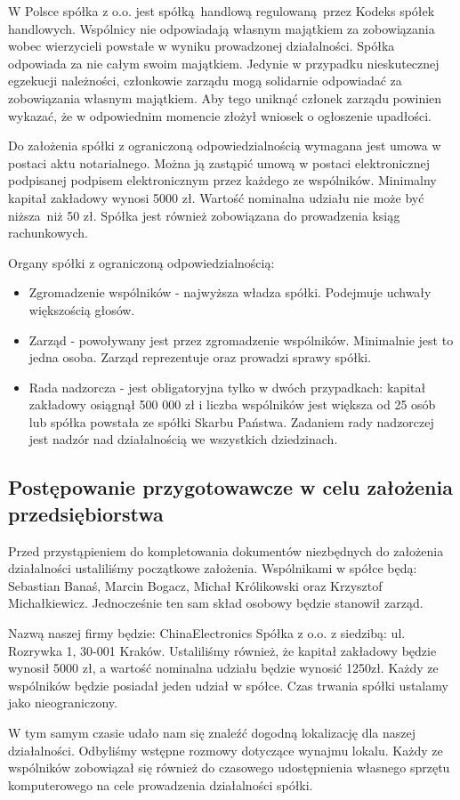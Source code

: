 W Polsce spółka z o.o. jest spółką handlową regulowaną przez Kodeks spółek handlowych. Wspólnicy nie odpowiadają własnym majątkiem za zobowiązania wobec wierzycieli powstałe w wyniku prowadzonej działalności. Spółka odpowiada za nie całym swoim majątkiem. Jedynie w przypadku nieskutecznej egzekucji należności, członkowie zarządu mogą solidarnie odpowiadać za zobowiązania własnym majątkiem. Aby tego uniknąć członek zarządu powinien wykazać, że w odpowiednim momencie złożył wniosek o ogłoszenie upadłości. 

Do założenia spółki z ograniczoną odpowiedzialnością wymagana jest umowa w postaci aktu notarialnego. Można ją zastąpić umową w postaci elektronicznej podpisanej podpisem elektronicznym przez każdego ze wspólników. Minimalny kapitał zakładowy wynosi 5000 zł. Wartość nominalna udziału nie może być niższa niż 50 zł. Spółka jest również zobowiązana do prowadzenia ksiąg rachunkowych.

Organy spółki z ograniczoną odpowiedzialnością:
\begin{itemize}
	\item Zgromadzenie wspólników - najwyższa władza spółki. Podejmuje uchwały większością głosów. 
	\item Zarząd - powoływany jest przez zgromadzenie wspólników. Minimalnie jest to jedna osoba. Zarząd reprezentuje oraz prowadzi sprawy spółki. 
	\item Rada nadzorcza - jest obligatoryjna tylko w dwóch przypadkach: kapitał zakładowy osiągnął 500 000 zł i liczba wspólników jest większa od 25 osób lub spółka powstała ze spółki Skarbu Państwa. Zadaniem rady nadzorczej jest nadzór nad działalnością we wszystkich dziedzinach.
\end{itemize}

\subsection{Postępowanie przygotowawcze w celu założenia przedsiębiorstwa}
Przed przystąpieniem do kompletowania dokumentów niezbędnych do założenia działalności ustaliliśmy początkowe założenia. Wspólnikami w spółce będą: Sebastian Banaś, Marcin Bogacz, Michał Królikowski oraz Krzysztof Michałkiewicz. Jednocześnie ten sam skład osobowy będzie stanowił zarząd.

Nazwą naszej firmy będzie: ChinaElectronics Spółka z o.o. z siedzibą: ul. Rozrywka 1, 30-001 Kraków. Ustaliliśmy również, że kapitał zakładowy będzie wynosił 5000 zł, a wartość nominalna udziału będzie wynosić 1250zł. Każdy ze wspólników będzie posiadał jeden udział w spółce. Czas trwania spółki ustalamy jako nieograniczony.

W tym samym czasie udało nam się znaleźć dogodną lokalizację dla naszej działalności. Odbyliśmy wstępne rozmowy dotyczące wynajmu lokalu. Każdy ze wspólników zobowiązał się również do czasowego udostępnienia własnego sprzętu komputerowego na cele prowadzenia działalności spółki. %